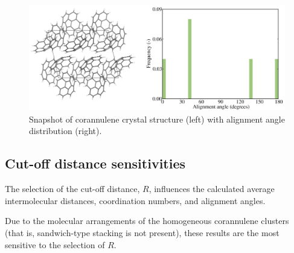 %
%
\begin{figure}[!tbh]
\centering
\includegraphics[width=0.65\linewidth]{Figures/corannulene_crystal.eps}
\caption{Snapshot of corannulene crystal structure (left) with alignment angle distribution (right).}
\label{figSI:corannulene_crystal}
\end{figure}
%

\subsection{Cut-off distance sensitivities}
The selection of the cut-off distance, $R$, influences the calculated average intermolecular distances, coordination numbers, and alignment angles.

Due to the molecular arrangements of the homogeneous corannulene clusters (that is, sandwich-type stacking is not present), these results are the most sensitive to the selection of $R$.


